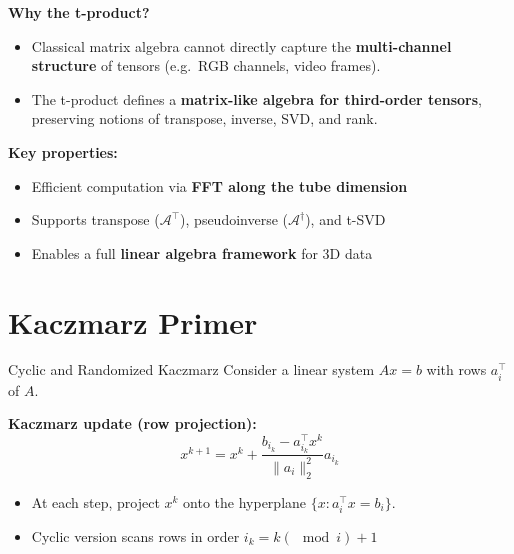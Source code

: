 \documentclass[aspectratio=169]{beamer}
\newcommand{\mcalA}{\mathcal{A}}
\begin{document}
\begin{frame}
    \textbf{Why the t-product?}
  \begin{itemize}
    \item Classical matrix algebra cannot directly capture the \textbf{multi-channel structure}
          of tensors (e.g.\ RGB channels, video frames).
    \item The t-product defines a \textbf{matrix-like algebra for third-order tensors},
          preserving notions of transpose, inverse, SVD, and rank.
  \end{itemize}
\end{frame}
\begin{frame}
   \medskip
  \textbf{Key properties:}
  \begin{itemize}
    \item Efficient computation via \textbf{FFT along the tube dimension}
    \item Supports transpose ($\mcalA^\top$), pseudoinverse ($\mcalA^\dagger$), and t-SVD
    \item Enables a full \textbf{linear algebra framework} for 3D data
  \end{itemize}
\end{frame}

\section{Kaczmarz Primer}
\begin{frame}{Cyclic and Randomized Kaczmarz}
  Consider a linear system $Ax=b$ with rows $a_i^\top$ of $A$.

  \medskip
  \textbf{Kaczmarz update (row projection):}
  \[
    x^{k+1} = x^k + \frac{b_{i_k} - a_{i_k}^\top x^k}{\|a_i\|_2^2} a_{i_k}
  \]
  \begin{itemize}
    \item At each step, project $x^k$ onto the hyperplane
          $\{x: a_i^\top x = b_i\}$.
    \item Cyclic version scans rows in order $i_k = k(\mod i) + 1 $ %
  \end{itemize}
\end{frame}
\end{document}
